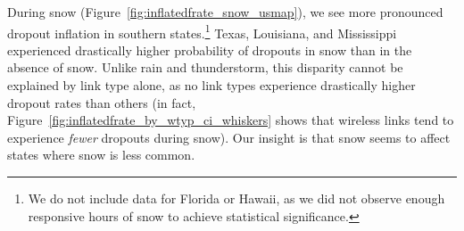 During snow (Figure~\ref{fig:inflatedfrate_snow_usmap}), we see more
pronounced dropout inflation in southern states.\footnote{We do not
include data for Florida or Hawaii, as we did not
observe enough responsive hours of snow to achieve statistical
significance.}
%
Texas, Louisiana, and Mississippi experienced drastically higher
probability of dropouts in snow than in the absence of snow.
%
Unlike rain and thunderstorm, this disparity cannot be explained by
link type alone, as no link types experience drastically higher dropout
rates than others (in fact,
Figure~\ref{fig:inflatedfrate_by_wtyp_ci_whiskers} shows that wireless
links tend to experience \emph{fewer} dropouts during snow).
%
Our insight is that snow seems to affect states where snow is less
common.











